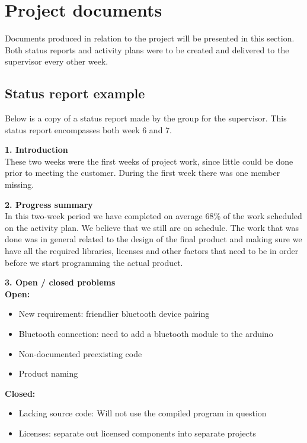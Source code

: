 \chapter{Project documents}
\label{appendix-project-documents}
Documents produced in relation to the project will be presented in this section. Both status reports and activity plans were to be created and delivered to the supervisor every other week. 

\section{Status report example}
Below is a copy of a status report made by the group for the supervisor. This status report encompasses both week 6 and 7.\\
\newline

\textbf{1. Introduction}\\
These two weeks were the first weeks of project work, since little could be done prior to meeting the customer. During the first week there was one member missing.\\
\newline

\textbf{2. Progress summary}\\
In this two-week period we have completed on average 68\% of the work scheduled on the activity plan. We believe that we still are on schedule. The work that was done was in general related to the design of the final product and making sure we have all the required libraries, licenses and other factors that need to be in order before we start programming the actual product.\\
\newline

\textbf{3. Open / closed problems}\\
\newline
\textbf{Open:}
\begin{itemize}
	\item{New requirement: friendlier bluetooth device pairing}
	\item{Bluetooth connection: need to add a bluetooth module to the arduino}
	\item{Non-documented preexisting code}
	\item{Product naming}
\end{itemize}
\vspace{8mm}

\textbf{Closed:}
\begin{itemize}
	\item{Lacking source code: Will not use the compiled program in question}
	\item{Licenses: separate out licensed components into separate projects}
\end{itemize}
\vspace{8mm}

